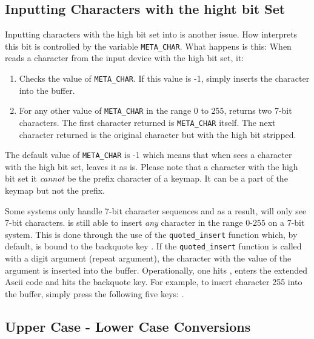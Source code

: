\subsection{Inputting Characters with the hight bit Set}
  Inputting characters with the high bit set into \jed{} is another issue.
  How \jed{} interprets this bit is controlled by the variable
  \verb|META_CHAR|. What happens is this: When \jed{} reads a character from
  the input device with the high bit set, it:
\begin{itemize}
\begin{enumerate}
\item Checks the value of \verb|META_CHAR|.  If this value is -1, \jed{} simply
      inserts the character into the buffer.

\item For any other value of \verb|META_CHAR| in the range 0 to 255, \jed{}
      returns two 7-bit characters.  The first character returned is
      \verb|META_CHAR| itself.  The next character returned is the original
      character but with the high bit stripped.
\end{enumerate}
\end{itemize} 

  The default value of \verb|META_CHAR| is -1 which means that when \jed{} sees
  a character with the high bit set, \jed{} leaves it as is.  Please note that
  a character with the high bit set it {\em cannot} be the prefix character
  of a keymap. It can be a part of the keymap but not the prefix.

  Some systems only handle 7-bit character sequences and as a result, \jed{}
  will only see 7-bit characters.  \jed{} is still able to insert {\em any}
  character in the range 0-255 on a 7-bit system.  This is done through the
  use of the \verb|quoted_insert| function which, by default, is bound to
  the backquote key .  If the \verb|quoted_insert| function is called
  with a digit argument (repeat argument), the character with the value of
  the argument is inserted into the buffer.  Operationally, one hits
  , enters the extended Ascii code and hits the backquote key.  For
  example, to insert character 255 into the buffer, simply press the
  following five keys: .

\subsection{Upper Case - Lower Case Conversions}

